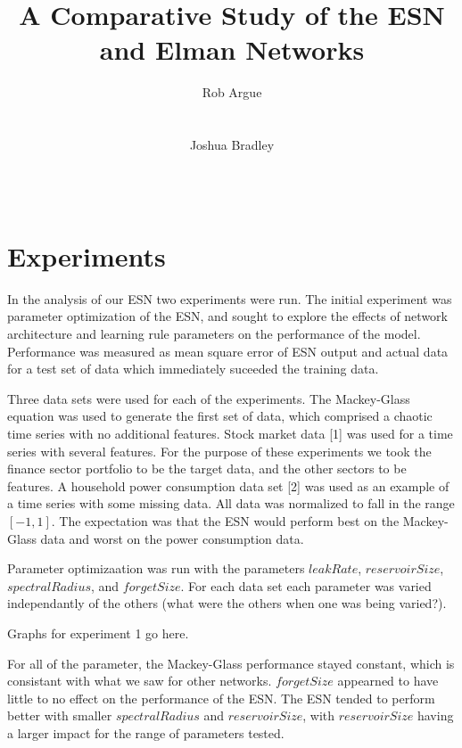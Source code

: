 \documentclass{acm_proc_article-sp}
\begin{document}
\title{A Comparative Study of the ESN and Elman Networks}

\author{
\alignauthor
Rob Argue\\
       \\
       \\
\alignauthor
Joshua Bradley\\
       \\
       \\
}
\maketitle

\section{Experiments}
In the analysis of our ESN two experiments were run. The initial experiment was parameter optimization of the ESN, and sought to explore the effects of network architecture and learning rule parameters on the performance of the model. Performance was measured as mean square error of ESN output and actual data for a test set of data which immediately suceeded the training data.

Three data sets were used for each of the experiments. The Mackey-Glass equation was used to generate the first set of data, which comprised a chaotic time series with no additional features. Stock market data [1] was used for a time series with several features. For the purpose of these experiments we took the finance sector portfolio to be the target data, and the other sectors to be features. A household power consumption data set [2] was used as an example of a time series with some missing data. All data was normalized to fall in the range $[-1,1]$. The expectation was that the ESN would perform best on the Mackey-Glass data and worst on the power consumption data.

Parameter optimizaation was run with the parameters $leakRate$, $reservoirSize$, $spectralRadius$, and $forgetSize$. For each data set each parameter was varied independantly of the others (what were the others when one was being varied?).

Graphs for experiment 1 go here.

For all of the parameter, the Mackey-Glass performance stayed constant, which is consistant with what we saw for other networks. $forgetSize$ appearned to have little to no effect on the performance of the ESN. The ESN tended to perform better with smaller $spectralRadius$ and $reservoirSize$, with $reservoirSize$ having a larger impact for the range of parameters tested. 
\end{document}
